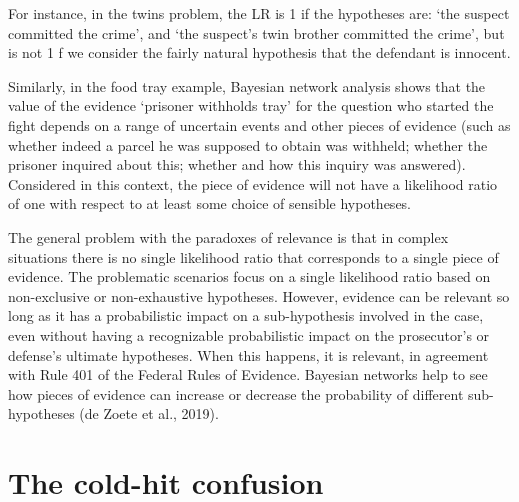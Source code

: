 \documentclass[10pt,dvipsnames,enabledeprecatedfontcommands]{scrartcl}
\begin{document}
For instance, in the twins problem, the LR is 1 if the hypotheses are:
`the suspect committed the crime', and `the suspect's twin brother
committed the crime', but is not 1 f we consider the fairly natural
hypothesis that the defendant is innocent.

Similarly, in the food tray example, Bayesian network analysis shows
that the value of the evidence `prisoner withholds tray' for the
question who started the fight depends on a range of uncertain events
and other pieces of evidence (such as whether indeed a parcel he was
supposed to obtain was withheld; whether the prisoner inquired about
this; whether and how this inquiry was answered). Considered in this
context, the piece of evidence will not have a likelihood ratio of one
with respect to at least some choice of sensible hypotheses.


The general problem with the paradoxes of relevance is that in complex
situations there is no single likelihood ratio that corresponds to a
single piece of evidence. The problematic scenarios focus on a single
likelihood ratio based on non-exclusive or non-exhaustive hypotheses.
However, evidence can be relevant so long as it has a probabilistic
impact on a sub-hypothesis involved in the case, even without having a
recognizable probabilistic impact on the prosecutor's or defense's
ultimate hypotheses. When this happens, it is relevant, in agreement
with Rule 401 of the Federal Rules of Evidence. Bayesian networks help
to see how pieces of evidence can increase or decrease the probability
of different sub-hypotheses (de Zoete et al., 2019).

\section{\texorpdfstring{The cold-hit confusion
\label{sec:coldHitConfusion}}{The cold-hit confusion }}\label{the-cold-hit-confusion}


\end{document}
